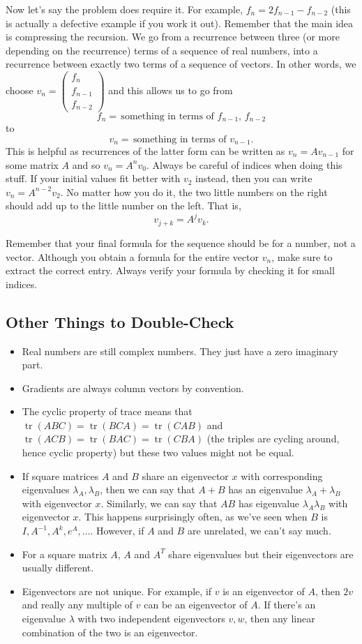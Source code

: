 \documentclass[11pt]{article}
\theoremstyle{plain} %
\theoremstyle{definition}
\theoremstyle{remark}
\DeclareMathOperator{\tr}{tr}
\begin{document}
Now let's say the problem does require it. For example, $f_{n} = 2f_{n-1} - f_{n-2}$ (this is actually a defective example if you work it out). Remember that the main idea is compressing the recursion. We go from a recurrence between three (or more depending on the recurrence) terms of a sequence of real numbers, into a recurrence between exactly two terms of a sequence of vectors. In other words, we choose $v_n = \begin{pmatrix}f_n\\f_{n-1}\\f_{n-2}\end{pmatrix}$ and this allows us to go from $$f_{n} =\, \text{something in terms of }f_{n-1},\, f_{n-2}$$ to $$v_{n} = \,\text{something in terms of }v_{n-1}.$$ This is helpful as recurrences of the latter form can be written as $v_n = Av_{n-1}$ for some matrix $A$ and so $v_n = A^n v_0$. Always be careful of indices when doing this stuff. If your initial values fit better with $v_2$ instead, then you can write $v_n = A^{n-2} v_2$. No matter how you do it, the two little numbers on the right should add up to the little number on the left. That is, $$v_{j+k} = A^j v_k.$$

Remember that your final formula for the sequence should be for a number, not a vector. Although you obtain a formula for the entire vector $v_n$, make sure to extract the correct entry. Always verify your formula by checking it for small indices. 

\subsection{Other Things to Double-Check}

\begin{itemize}
\item Real numbers are still complex numbers. They just have a zero imaginary part.
\item Gradients are always column vectors by convention.
\item The cyclic property of trace means that $\tr(ABC) = \tr(BCA) = \tr(CAB)$ and $\tr(ACB) = \tr(BAC) = \tr(CBA)$ (the triples are cycling around, hence cyclic property) but these two values might not be equal.
\item If square matrices $A$ and $B$ share an eigenvector $x$ with corresponding eigenvalues $\lambda_A, \lambda_B$, then we can say that $A+B$ has an eigenvalue $\lambda_A + \lambda_B$ with eigenvector $x$. Similarly, we can say that $AB$ has eigenvalue $\lambda_A\lambda_B$ with eigenvector $x$. This happens surprisingly often, as we've seen when $B$ is $I, A^{-1}, A^k, e^A, \ldots$. However, if $A$ and $B$ are unrelated, we can't say much.
\item For a square matrix $A$, $A$ and $A^T$ share eigenvalues but their eigenvectors are usually different.
\item Eigenvectors are not unique. For example, if $v$ is an eigenvector of $A$, then $2v$ and really any multiple of $v$ can be an eigenvector of $A$. If there's an eigenvalue $\lambda$ with two independent eigenvectors $v, w$, then any linear combination of the two is an eigenvector.
\end{itemize}
\end{document}
